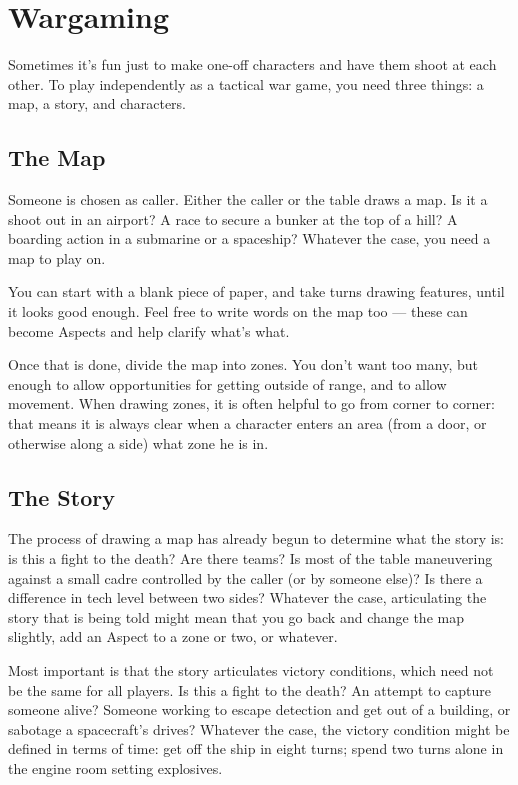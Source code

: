 \iflandscape{}{\newpage}\section[Wargaming]{Wargaming}
\label{sec:personal-combat-wargaming}

Sometimes it's fun just to make one-off characters and have them shoot at each other. To play independently as a tactical war game, you need three things: a map, a story, and characters.

\subsection{The Map}
\label{sec:personal-combat-wargaming-map}

Someone is chosen as caller. Either the caller or the table draws a map. Is it a shoot out in an airport? A race to secure a bunker at the top of a hill? A boarding action in a submarine or a spaceship? Whatever the case, you need a map to play on.

You can start with a blank piece of paper, and take turns drawing features, until it looks good enough. Feel free to write words on the map too --- these can become Aspects and help clarify what's what.

Once that is done, divide the map into zones. You don't want too many, but enough to allow opportunities for getting outside of range, and to allow movement. When drawing zones, it is often helpful to go from corner to corner: that means it is always clear when a character enters an area (from a door, or otherwise along a side) what zone he is in.

\subsection{The Story}
\label{sec:personal-combat-wargaming-story}

The process of drawing a map has already begun to determine what the story is: is this a fight to the death? Are there teams? Is most of the table maneuvering against a small cadre controlled by the caller (or by someone else)? Is there a difference in tech level between two sides? Whatever the case, articulating the story that is being told might mean that you go back and change the map slightly, add an Aspect to a zone or two, or whatever.

Most important is that the story articulates victory conditions, which need not be the same for all players. Is this a fight to the death? An attempt to capture someone alive? Someone working to escape detection and get out of a building, or sabotage a spacecraft's drives? Whatever the case, the victory condition might be defined in terms of time: get off the ship in eight turns; spend two turns alone in the engine room setting explosives.

